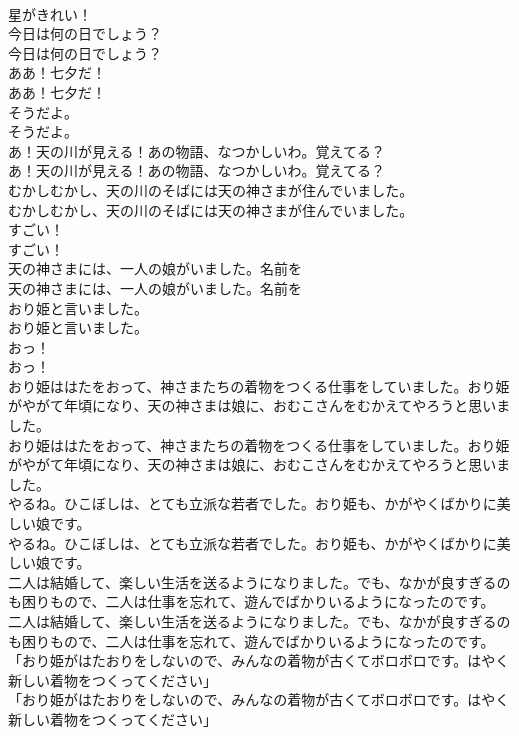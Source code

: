 \documentclass[8pt]{extreport}
\begin{document}
\begin{CJK}{UTF8}{min}
\\	星がきれい！ 
\\	今日は何の日でしょう？	
\\	今日は何の日でしょう？ 
\\	ああ！七夕だ！	
\\	ああ！七夕だ！ 
\\	そうだよ。	
\\	そうだよ。 
\\	あ！天の川が見える！あの物語、なつかしいわ。覚えてる？	
\\	あ！天の川が見える！あの物語、なつかしいわ。覚えてる？ 
\\	むかしむかし、天の川のそばには天の神さまが住んでいました。	
\\	むかしむかし、天の川のそばには天の神さまが住んでいました。 
\\	すごい！	
\\	すごい！ 
\\	天の神さまには、一人の娘がいました。名前を	
\\	天の神さまには、一人の娘がいました。名前を 
\\	おり姫と言いました。	
\\	おり姫と言いました。 
\\	おっ！	
\\	おっ！ 
\\	おり姫ははたをおって、神さまたちの着物をつくる仕事をしていました。おり姫がやがて年頃になり、天の神さまは娘に、おむこさんをむかえてやろうと思いました。	
\\	おり姫ははたをおって、神さまたちの着物をつくる仕事をしていました。おり姫がやがて年頃になり、天の神さまは娘に、おむこさんをむかえてやろうと思いました。 
\\	やるね。ひこぼしは、とても立派な若者でした。おり姫も、かがやくばかりに美しい娘です。	
\\	やるね。ひこぼしは、とても立派な若者でした。おり姫も、かがやくばかりに美しい娘です。 
\\	二人は結婚して、楽しい生活を送るようになりました。でも、なかが良すぎるのも困りもので、二人は仕事を忘れて、遊んでばかりいるようになったのです。	
\\	二人は結婚して、楽しい生活を送るようになりました。でも、なかが良すぎるのも困りもので、二人は仕事を忘れて、遊んでばかりいるようになったのです。 
\\	「おり姫がはたおりをしないので、みんなの着物が古くてボロボロです。はやく新しい着物をつくってください」	
\\	「おり姫がはたおりをしないので、みんなの着物が古くてボロボロです。はやく新しい着物をつくってください」 

\end{CJK}
\end{document}
